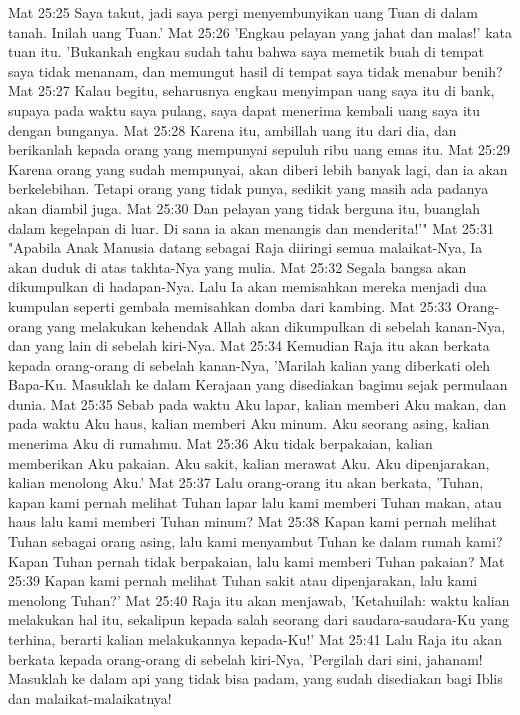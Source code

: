 Mat 25:25  Saya takut, jadi saya pergi menyembunyikan uang Tuan di dalam tanah. Inilah uang Tuan.'
Mat 25:26  'Engkau pelayan yang jahat dan malas!' kata tuan itu. 'Bukankah engkau sudah tahu bahwa saya memetik buah di tempat saya tidak menanam, dan memungut hasil di tempat saya tidak menabur benih?
Mat 25:27  Kalau begitu, seharusnya engkau menyimpan uang saya itu di bank, supaya pada waktu saya pulang, saya dapat menerima kembali uang saya itu dengan bunganya.
Mat 25:28  Karena itu, ambillah uang itu dari dia, dan berikanlah kepada orang yang mempunyai sepuluh ribu uang emas itu.
Mat 25:29  Karena orang yang sudah mempunyai, akan diberi lebih banyak lagi, dan ia akan berkelebihan. Tetapi orang yang tidak punya, sedikit yang masih ada padanya akan diambil juga.
Mat 25:30  Dan pelayan yang tidak berguna itu, buanglah dalam kegelapan di luar. Di sana ia akan menangis dan menderita!'"
Mat 25:31  "Apabila Anak Manusia datang sebagai Raja diiringi semua malaikat-Nya, Ia akan duduk di atas takhta-Nya yang mulia.
Mat 25:32  Segala bangsa akan dikumpulkan di hadapan-Nya. Lalu Ia akan memisahkan mereka menjadi dua kumpulan seperti gembala memisahkan domba dari kambing.
Mat 25:33  Orang-orang yang melakukan kehendak Allah akan dikumpulkan di sebelah kanan-Nya, dan yang lain di sebelah kiri-Nya.
Mat 25:34  Kemudian Raja itu akan berkata kepada orang-orang di sebelah kanan-Nya, 'Marilah kalian yang diberkati oleh Bapa-Ku. Masuklah ke dalam Kerajaan yang disediakan bagimu sejak permulaan dunia.
Mat 25:35  Sebab pada waktu Aku lapar, kalian memberi Aku makan, dan pada waktu Aku haus, kalian memberi Aku minum. Aku seorang asing, kalian menerima Aku di rumahmu.
Mat 25:36  Aku tidak berpakaian, kalian memberikan Aku pakaian. Aku sakit, kalian merawat Aku. Aku dipenjarakan, kalian menolong Aku.'
Mat 25:37  Lalu orang-orang itu akan berkata, 'Tuhan, kapan kami pernah melihat Tuhan lapar lalu kami memberi Tuhan makan, atau haus lalu kami memberi Tuhan minum?
Mat 25:38  Kapan kami pernah melihat Tuhan sebagai orang asing, lalu kami menyambut Tuhan ke dalam rumah kami? Kapan Tuhan pernah tidak berpakaian, lalu kami memberi Tuhan pakaian?
Mat 25:39  Kapan kami pernah melihat Tuhan sakit atau dipenjarakan, lalu kami menolong Tuhan?'
Mat 25:40  Raja itu akan menjawab, 'Ketahuilah: waktu kalian melakukan hal itu, sekalipun kepada salah seorang dari saudara-saudara-Ku yang terhina, berarti kalian melakukannya kepada-Ku!'
Mat 25:41  Lalu Raja itu akan berkata kepada orang-orang di sebelah kiri-Nya, 'Pergilah dari sini, jahanam! Masuklah ke dalam api yang tidak bisa padam, yang sudah disediakan bagi Iblis dan malaikat-malaikatnya!
